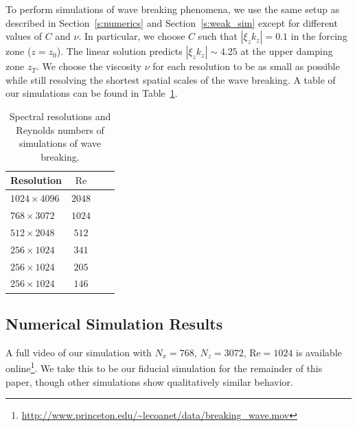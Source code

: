 \documentclass[
        fleqn,
        usenatbib,
    ]{mnras}
\newcommand*{\abs}[1]{\left|#1\right|}
\begin{document}

To perform simulations of wave breaking phenomena, we use the same setup as
described in Section~\ref{s:numerics} and Section~\ref{s:weak_sim} except for
different values of $C$ and $\nu$. In particular, we choose $C$ such that
$\abs{\xi_z k_z} = 0.1$ in the forcing zone ($z = z_0$). The linear solution
predicts $\abs{\xi_z k_z} \sim 4.25$ at the upper damping zone $z_T$.
We choose the viscosity $\nu$ for each resolution to be as
small as possible while still resolving the shortest spatial scales of the wave
breaking. A table of our simulations can be found in Table~\ref{tab:params}.
\begin{table}
    \centering
    \begin{tabular}{l c c c}
        Resolution & $\mathrm{Re}$\\\bottomrule
        $1024 \times 4096$ & $2048$\\
        $768 \times 3072$ & $1024$\\
        $512 \times 2048$ & $512$\\
        $256 \times 1024$ & $341$\\
        $256 \times 1024$ & $205$\\
        $256 \times 1024$ & $146$\\
    \end{tabular}
    \caption{Spectral resolutions and Reynolds numbers of simulations of wave
    breaking.}\label{tab:params}
\end{table}

\subsection{Numerical Simulation Results}\label{ss:nl_ns}

A full video of our simulation with $N_x = 768$, $N_z = 3072$, $\mathrm{Re} =
1024$ is available
online\footnote{\url{http://www.princeton.edu/\~lecoanet/data/breaking\_wave.mov}}. We
take this to be our fiducial simulation for the remainder of this paper, though
other simulations show qualitatively similar behavior.
\end{document}
